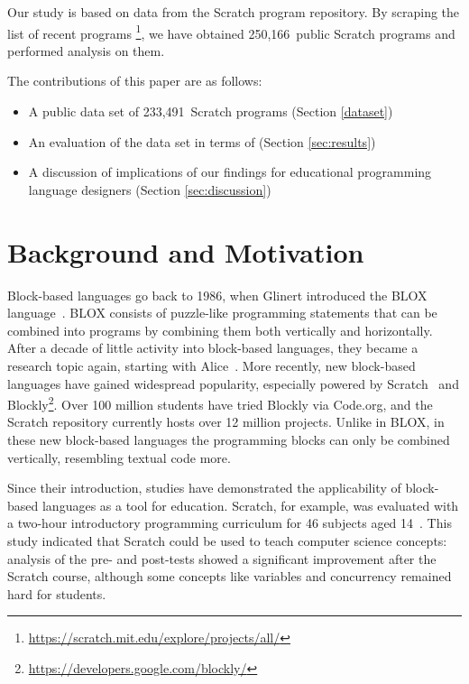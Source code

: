 \documentclass{sig-alternate}
\newcommand{\nPrograms}{250,166}
\newcommand{\nScriptPrograms}{233,491}
\begin{document}
Our study is based on data from the Scratch program repository. By scraping the list of recent programs \footnote{\url{https://scratch.mit.edu/explore/projects/all/}}, we have obtained \nPrograms~public Scratch programs and performed analysis on them.

The contributions of this paper are as follows:

\begin{itemize}
	\item{A public data set of \nScriptPrograms~Scratch programs (Section \ref{dataset})}
	\item{An evaluation of the data set in terms of (Section \ref{sec:results})}
	\item{A discussion of implications of our findings for educational programming language designers (Section \ref{sec:discussion})}
\end{itemize}


\section{Background and Motivation}
\label{sec:background}
Block-based languages go back to 1986, when Glinert introduced the BLOX language~\cite{e._glinert_towards_1986}. BLOX consists of puzzle-like programming statements that can be combined into programs by combining them both vertically and horizontally. After a decade of little activity into block-based languages, they became a research topic again, starting with Alice~\cite{conway_alice:_1994}. More recently, new block-based languages have gained widespread popularity, especially powered by Scratch~\cite{resnick_scratch:_2009} and Blockly\footnote{\url{https://developers.google.com/blockly/}}. Over 100 million students have tried Blockly via Code.org, and the Scratch repository currently hosts over 12 million projects. Unlike in BLOX, in these new block-based languages the programming blocks can only be combined vertically, resembling textual code more.

Since their introduction, studies have demonstrated the applicability of block-based languages as a tool for education. Scratch, for example, was evaluated with a two-hour introductory programming curriculum for 46 subjects aged 14~\cite{meerbaum-salant_learning_2010}. This study indicated that Scratch could be used to teach computer science concepts: analysis of the pre- and post-tests showed a significant improvement after the Scratch course, although some concepts like variables and concurrency remained hard for students.
\end{document}
